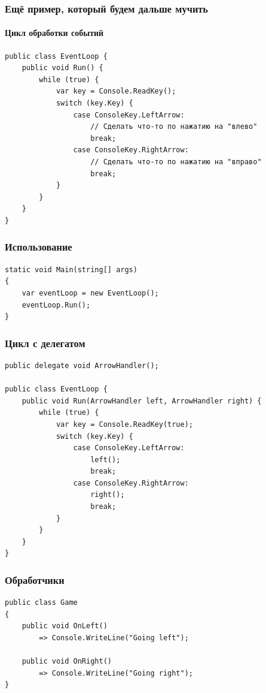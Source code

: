 \documentclass{../../slides-style}
\begin{document}
    \begin{frame}[fragile]
        \frametitle{Ещё пример, который будем дальше мучить}
        \framesubtitle{Цикл обработки событий}
        \begin{footnotesize}
            \begin{verbatim}
public class EventLoop {
    public void Run() {
        while (true) {
            var key = Console.ReadKey();
            switch (key.Key) {
                case ConsoleKey.LeftArrow:
                    // Сделать что-то по нажатию на "влево"
                    break;
                case ConsoleKey.RightArrow:
                    // Сделать что-то по нажатию на "вправо"
                    break;
            }
        }
    }
}
            \end{verbatim}
        \end{footnotesize}
    \end{frame}

    \begin{frame}[fragile]
        \frametitle{Использование}
        \begin{verbatim}
static void Main(string[] args)
{
    var eventLoop = new EventLoop();
    eventLoop.Run();
}
        \end{verbatim}
    \end{frame}

    \begin{frame}[fragile]
        \frametitle{Цикл с делегатом}
        \begin{footnotesize}
            \begin{verbatim}
public delegate void ArrowHandler();

public class EventLoop {
    public void Run(ArrowHandler left, ArrowHandler right) {
        while (true) {
            var key = Console.ReadKey(true);
            switch (key.Key) {
                case ConsoleKey.LeftArrow:
                    left();
                    break;
                case ConsoleKey.RightArrow:
                    right();
                    break;
            }
        }
    }
}
            \end{verbatim}
        \end{footnotesize}
    \end{frame}

    \begin{frame}[fragile]
        \frametitle{Обработчики}
        \begin{verbatim}
public class Game
{
    public void OnLeft()
        => Console.WriteLine("Going left");

    public void OnRight()
        => Console.WriteLine("Going right");
}
        \end{verbatim}
    \end{frame}
\end{document}
